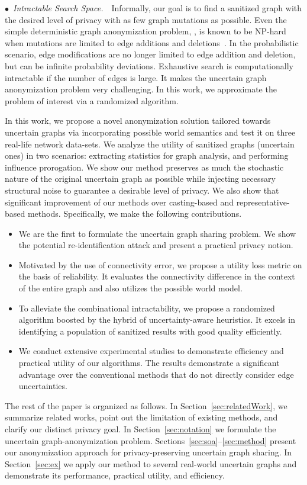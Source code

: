 $\bullet$~\textup{\emph{Intractable Search Space.}}~~Informally, our goal is to find a sanitized graph with the desired level of privacy with as few graph mutations as possible. 
Even the simple deterministic graph anonymization problem, {\ie}, is known to be NP-hard when mutations are limited to edge additions and deletions~\cite{Hartung_Theory_2015}. 
In the probabilistic scenario, edge modifications are no longer limited to edge addition and deletion, but can be infinite probability deviations. 
Exhaustive search is computationally intractable if the number of edges is large. 
It makes the uncertain graph anonymization problem very challenging. 
In this work, we approximate the problem of interest via a randomized algorithm. 

In this work, we propose a novel anonymization solution tailored towards uncertain graphs via incorporating possible world semantics and test it on three real-life network data-sets. We analyze the utility of sanitized graphs (uncertain ones) in two scenarios: extracting statistics for graph analysis, and performing influence prorogation. We show our method preserves as much the stochastic nature of the original uncertain graph as possible while injecting necessary structural noise to guarantee a desirable level of privacy. We also show that significant improvement of our methods over casting-based and representative-based methods. 
Specifically, we make the following contributions.
\begin{itemize}
\item We are the first to formulate the uncertain graph sharing problem. 
 We show the potential re-identification attack and present a practical privacy notion. 
\item Motivated by the use of connectivity error, we propose a utility loss metric on the basis of reliability. It evaluates the connectivity difference in the context of the entire graph and also utilizes the possible world model. 
\item To alleviate the combinational intractability, we propose a randomized algorithm boosted by the hybrid of uncertainty-aware heuristics. It excels in identifying a population of sanitized results with good quality efficiently.
\item We conduct extensive experimental studies to demonstrate efficiency and practical utility of our algorithms. The results demonstrate a significant advantage over the conventional methods that do not directly consider edge uncertainties.
\end{itemize}

The rest of the paper is organized as follows. In Section~\ref{sec:relatedWork}, we summarize related works, point out the limitation of existing methods, and clarify our distinct privacy goal. In Section~\ref{sec:notation} we formulate the uncertain graph-anonymization problem. Sections~\ref{sec:soa}--\ref{sec:method} present our anonymization approach for privacy-preserving uncertain graph sharing.  In Section~\ref{sec:ex} we apply our method to several real-world uncertain graphs and demonstrate its performance, practical utility, and efficiency. 